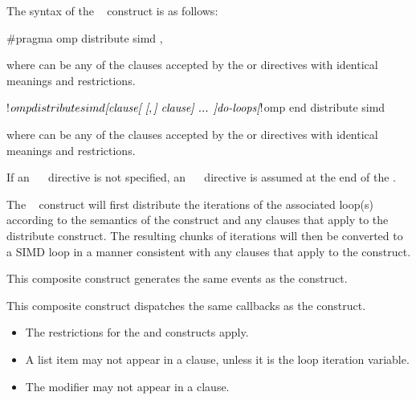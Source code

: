 \syntax
The syntax of the ~ construct is as follows:

\begin{ccppspecific}
\begin{ompcPragma}
#pragma omp distribute simd \plc{[clause[ [},\plc{] clause] ... ] newline}
\end{ompcPragma}

where  can be any of the clauses accepted by the  or 
directives with identical meanings and restrictions.
\end{ccppspecific}

\begin{fortranspecific}
\begin{ompfPragma}
!$omp distribute simd \plc{[clause[ [},\plc{] clause] ... ]}
   \plc{do-loops}
\plc{[}!$omp end distribute simd\plc{]}
\end{ompfPragma}

where  can be any of the clauses accepted by the  or 
directives with identical meanings and restrictions.

If an ~~ directive is not specified, an ~~
directive is assumed at the end of the .
\end{fortranspecific}

\descr
The ~ construct will first distribute the iterations of the associated
loop(s) according to the semantics of the  construct and any clauses that
apply to the distribute construct. The resulting chunks of iterations will then be
converted to a SIMD loop in a manner consistent with any clauses that apply to the
 construct.

\events

This composite construct generates the same events as the  construct.

\tools

This composite construct dispatches the same callbacks as the  construct.

\restrictions
\begin{itemize}
\item The restrictions for the  and  constructs apply.

\item A list item may not appear in a  clause, unless it is the loop iteration variable.

\item The  modifier may not appear in a  clause.
\end{itemize}

